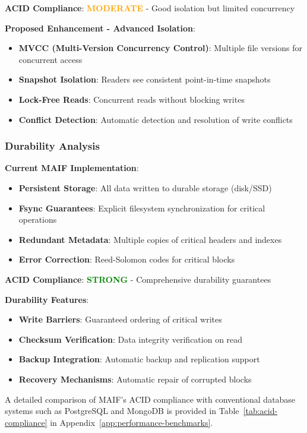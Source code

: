 \documentclass[conference]{IEEEtran}
\begin{document}
\begin{itemize}[leftmargin=*]
\textbf{ACID Compliance}: \textcolor{orange}{\textbf{MODERATE}} - Good isolation but limited concurrency

\textbf{Proposed Enhancement - Advanced Isolation}:
\begin{itemize}[leftmargin=*]
\item \textbf{MVCC (Multi-Version Concurrency Control)}: Multiple file versions for concurrent access
\item \textbf{Snapshot Isolation}: Readers see consistent point-in-time snapshots
\item \textbf{Lock-Free Reads}: Concurrent reads without blocking writes
\item \textbf{Conflict Detection}: Automatic detection and resolution of write conflicts
\end{itemize}

\subsubsection{Durability Analysis}

\textbf{Current MAIF Implementation}:
\begin{itemize}[leftmargin=*]
\item \textbf{Persistent Storage}: All data written to durable storage (disk/SSD)
\item \textbf{Fsync Guarantees}: Explicit filesystem synchronization for critical operations
\item \textbf{Redundant Metadata}: Multiple copies of critical headers and indexes
\item \textbf{Error Correction}: Reed-Solomon codes for critical blocks
\end{itemize}

\textbf{ACID Compliance}: \textcolor{green}{\textbf{STRONG}} - Comprehensive durability guarantees

\textbf{Durability Features}:
\begin{itemize}[leftmargin=*]
\item \textbf{Write Barriers}: Guaranteed ordering of critical writes
\item \textbf{Checksum Verification}: Data integrity verification on read
\item \textbf{Backup Integration}: Automatic backup and replication support
\item \textbf{Recovery Mechanisms}: Automatic repair of corrupted blocks
\end{itemize}
A detailed comparison of MAIF's ACID compliance with conventional database systems such as PostgreSQL and MongoDB is provided in Table~\ref{tab:acid-compliance} in Appendix~\ref{app:performance-benchmarks}.


\end{itemize}
\end{document}
